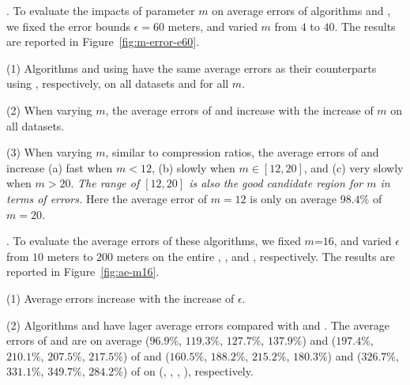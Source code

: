 .
To evaluate the impacts of parameter $m$ on average errors of algorithms \cist and \cista, we fixed the error bounds {$\epsilon =60$ meters}, and varied $m$ from $4$ to $40$. The results are reported in Figure~\ref{fig:m-error-e60}.



\ni(1) Algorithms \cist and \cista using \rpia have the same average errors as their counterparts using \cpia, respectively, on all datasets and for all $m$.

\ni(2) When varying $m$, the average errors of \cist and \cista increase with the increase of $m$ on all datasets.

\ni(3) When varying $m$, similar to compression ratios, the average errors of \cist and \cista increase (a) fast when $m < 12$, (b) slowly when $m \in [12, 20]$, and (c) very slowly when $m > 20$. \emph{The range of $[12, 20]$ is also the good candidate region for $m$ in terms of errors.} Here the average error of $m=12$ is only on average {$98.4\%$} of $m=20$.




.
To evaluate the average errors of these algorithms, we fixed {$m$=$16$}, and varied $\epsilon$ from $10$ meters to $200$ meters on the entire \truck, \sercar, \geolife and \pricar, respectively.
The results are reported in Figure~\ref{fig:ae-m16}.

\ni(1) Average errors increase with the increase of $\epsilon$.

\ni(2) Algorithms \cist and \cista have lager average errors compared with \dps and \squishe.
The average errors of \cist and \cista are on average ($96.9\%$, $119.3\%$, $127.7\%$, $137.9\%$) and ($197.4\%$, $210.1\%$, $207.5\%$, $217.5\%$) of \dps and ($160.5\%$, $188.2\%$, $215.2\%$, {$180.3\%$}) and ($326.7\%$, $331.1\%$, $349.7\%$, {$284.2\%$}) of \squishe on (\truck, \sercar, \geolife, \pricar), respectively.

